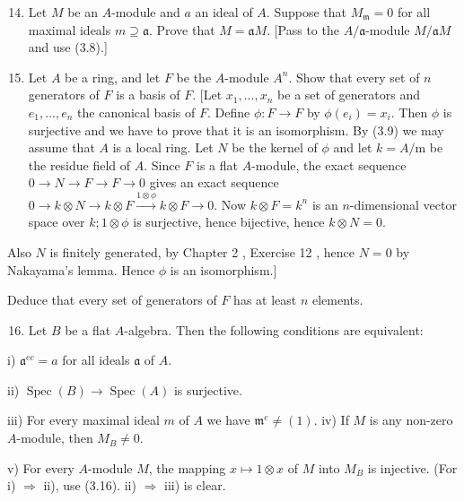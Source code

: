\documentclass{standalone}
\theoremstyle{definition}
\theoremstyle{remark}
\begin{document}
\begin{enumerate}
  \setcounter{enumi}{13}
  \item Let $M$ be an $A$-module and $a$ an ideal of $A$. Suppose that $M_{\mathfrak{m}}=0$ for all maximal ideals $m \supseteq \mathfrak{a}$. Prove that $M=\mathfrak{a} M$. [Pass to the $A / \mathfrak{a}$-module $M / \mathfrak{a} M$ and use (3.8).]

  \item Let $A$ be a ring, and let $F$ be the $A$-module $A^{n}$. Show that every set of $n$ generators of $F$ is a basis of $F$. [Let $x_{1}, \ldots, x_{n}$ be a set of generators and $e_{1}, \ldots, e_{n}$ the canonical basis of $F$. Define $\phi: F \rightarrow F$ by $\phi\left(e_{i}\right)=x_{i}$. Then $\phi$ is surjective and we have to prove that it is an isomorphism. By (3.9) we may assume that $A$ is a local ring. Let $N$ be the kernel of $\phi$ and let $k=A / \mathrm{m}$ be the residue field of $A$. Since $F$ is a flat $A$-module, the exact sequence $0 \rightarrow N \rightarrow F \rightarrow F \rightarrow 0$ gives an exact sequence $0 \longrightarrow k \otimes N \longrightarrow k \otimes F \stackrel{1 \otimes \phi}{\longrightarrow} k \otimes F \longrightarrow 0$. Now $k \otimes F=k^{n}$ is an $n$-dimensional vector space over $k ; 1 \otimes \phi$ is surjective, hence bijective, hence $k \otimes N=0$.

\end{enumerate}

Also $N$ is finitely generated, by Chapter 2 , Exercise 12 , hence $N=0$ by Nakayama's lemma. Hence $\phi$ is an isomorphism.]

Deduce that every set of generators of $F$ has at least $n$ elements.

\begin{enumerate}
  \setcounter{enumi}{15}
  \item Let $B$ be a flat $A$-algebra. Then the following conditions are equivalent:
\end{enumerate}

i) $\mathfrak{a}^{e c}=a$ for all ideals $\mathfrak{a}$ of $A$.

ii) $\operatorname{Spec}(B) \rightarrow \operatorname{Spec}(A)$ is surjective.

iii) For every maximal ideal $m$ of $A$ we have $\mathfrak{m}^{e} \neq(1)$. iv) If $M$ is any non-zero $A$-module, then $M_{B} \neq 0$.

v) For every $A$-module $M$, the mapping $x \mapsto 1 \otimes x$ of $M$ into $M_{B}$ is injective. (For i) $\Rightarrow$ ii), use (3.16). ii) $\Rightarrow$ iii) is clear.
\end{document}
